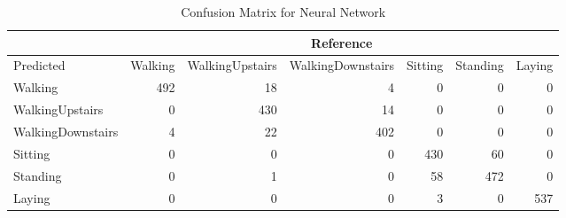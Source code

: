 \begin{table}[ht]
\centering
\caption{Confusion Matrix for Neural Network} 
\label{tab:nnet}
\begin{tabular}{l|rrrrrr}
  &\multicolumn{6}{c}{Reference}\\
 \hline
Predicted & Walking & WalkingUpstairs & WalkingDownstairs & Sitting & Standing & Laying \\ 
  \hline
Walking & 492 &  18 &   4 &   0 &   0 &   0 \\ 
  WalkingUpstairs &   0 & 430 &  14 &   0 &   0 &   0 \\ 
  WalkingDownstairs &   4 &  22 & 402 &   0 &   0 &   0 \\ 
  Sitting &   0 &   0 &   0 & 430 &  60 &   0 \\ 
  Standing &   0 &   1 &   0 &  58 & 472 &   0 \\ 
  Laying &   0 &   0 &   0 &   3 &   0 & 537 \\ 
   \hline
\end{tabular}
\end{table}
